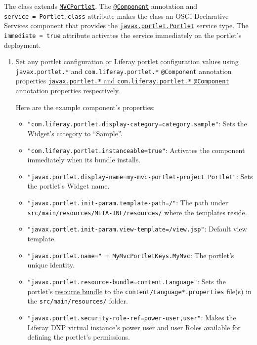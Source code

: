 The class extends
\href{https://docs.liferay.com/dxp/portal/7.2-latest/javadocs/portal-kernel/com/liferay/portal/kernel/portlet/bridges/mvc/MVCPortlet.html}{\texttt{MVCPortlet}}.
The
\href{https://docs.osgi.org/javadoc/osgi.cmpn/7.0.0/org/osgi/service/component/annotations/Component.html}{\texttt{@Component}}
annotation and \texttt{service\ =\ Portlet.class} attribute makes the
class an OSGi Declarative Services component that provides the
\href{https://docs.liferay.com/portlet-api/3.0/javadocs/javax/portlet/Portlet.html}{\texttt{javax.portlet.Portlet}}
service type. The \texttt{immediate\ =\ true} attribute activates the
service immediately on the portlet's deployment.

\begin{enumerate}
\def\labelenumi{\arabic{enumi}.}
\setcounter{enumi}{1}
\item
  Set any portlet configuration or Liferay portlet configuration values
  using \texttt{javax.portlet.*} and \texttt{com.liferay.portlet.*}
  \texttt{@Component} annotation properties
  \href{/docs/7-2/reference/-/knowledge_base/r/portlet-descriptor-to-osgi-service-property-map}{\texttt{javax.portlet.*}
  and \texttt{com.liferay.portlet.*} \texttt{@Component} annotation
  properties} respectively.

  Here are the example component's properties:

  \begin{itemize}
  \item
    \texttt{"com.liferay.portlet.display-category=category.sample"}:
    Sets the Widget's category to ``Sample''.
  \item
    \texttt{"com.liferay.portlet.instanceable=true"}: Activates the
    component immediately when its bundle installs.
  \item
    \texttt{"javax.portlet.display-name=my-mvc-portlet-project\ Portlet"}:
    Sets the portlet's Widget name.
  \item
    \texttt{"javax.portlet.init-param.template-path=/"}: The path under
    \texttt{src/main/resources/META-INF/resources/} where the templates
    reside.
  \item
    \texttt{"javax.portlet.init-param.view-template=/view.jsp"}: Default
    view template.
  \item
    \texttt{"javax.portlet.name="\ +\ MyMvcPortletKeys.MyMvc}: The
    portlet's unique identity.
  \item
    \texttt{"javax.portlet.resource-bundle=content.Language"}: Sets the
    portlet's
    \href{/docs/7-2/frameworks/-/knowledge_base/f/localization}{resource
    bundle} to the \texttt{content/Language*.properties} file(s) in the
    \texttt{src/main/resources/} folder.
  \item
    \texttt{"javax.portlet.security-role-ref=power-user,user"}: Makes
    the Liferay DXP virtual instance's power user and user Roles
    available for defining the portlet's permissions.
  \end{itemize}
\end{enumerate}

